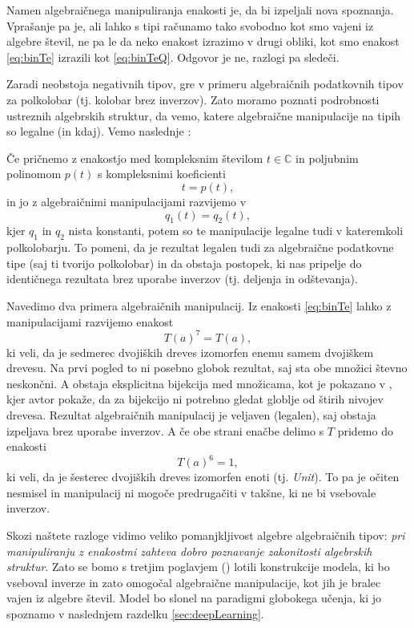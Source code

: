 \documentclass[a4paper, 12pt]{book}
\begin{document}
Namen algebraičnega manipuliranja enakosti je, da bi izpeljali nova spoznanja. Vprašanje pa je, ali lahko s tipi računamo tako svobodno kot smo vajeni iz algebre števil, ne pa le da neko enakost izrazimo v drugi obliki, kot smo enakost \eqref{eq:binTe} izrazili kot \eqref{eq:binTeQ}. Odgovor je ne, razlogi pa sledeči.

Zaradi neobstoja negativnih tipov, gre v primeru algebraičnih podatkovnih tipov za polkolobar (tj. kolobar brez inverzov). Zato moramo poznati podrobnosti ustreznih algebrskih struktur, da vemo, katere algebraične manipulacije na tipih so legalne (in kdaj). Vemo naslednje \cite{complexCat}: 

\noindent Če pričnemo z enakostjo med kompleksnim številom $t\in\mathbb{C}$ in poljubnim polinomom $p(t)$ s kompleksnimi koeficienti
$$t=p(t),$$
in jo z algebraičnimi manipulacijami razvijemo v
$$q_1(t)=q_2(t),$$
kjer $q_1$ in $q_2$ nista konstanti, potem so te manipulacije legalne tudi v kateremkoli polkolobarju. To pomeni, da je rezultat legalen tudi za algebraične podatkovne tipe (saj ti tvorijo polkolobar) in da obstaja postopek, ki nas pripelje do identičnega rezultata brez uporabe inverzov (tj. deljenja in odštevanja).

Navedimo dva primera algebraičnih manipulacij. Iz enakosti \eqref{eq:binTe} lahko z manipulacijami razvijemo enakost
$$T(a)^7=T(a),$$
ki veli, da je sedmerec dvojiških dreves izomorfen enemu samem dvojiškem drevesu. Na prvi pogled to ni posebno globok rezultat, saj sta obe množici števno neskončni. A obstaja eksplicitna bijekcija med množicama, kot je pokazano v \cite{7Trees}, kjer  avtor pokaže, da za bijekcijo ni potrebno gledat globlje od štirih nivojev drevesa. Rezultat algebraičnih manipulacij je veljaven (legalen), saj obstaja izpeljava brez uporabe inverzov.
A če obe strani enačbe delimo s $T$ pridemo do enakosti
$$T(a)^6=1,$$
ki veli, da je šesterec dvojiških dreves izomorfen enoti (tj. \emph{Unit}). To pa je očiten nesmisel in manipulacij ni mogoče predrugačiti v takšne, ki ne bi vsebovale inverzov.

Skozi naštete razloge vidimo veliko pomanjkljivost algebre algebraičnih tipov: 
\emph{pri manipuliranju z enakostmi zahteva dobro poznavanje zakonitosti algebrskih struktur}. Zato se bomo s tretjim poglavjem () lotili konstrukcije modela, ki bo vseboval inverze in zato omogočal algebraične manipulacije, kot jih je bralec vajen iz algebre števil. Model bo slonel na paradigmi globokega učenja, ki jo spoznamo v naslednjem razdelku \ref{sec:deepLearning}.
\end{document}
